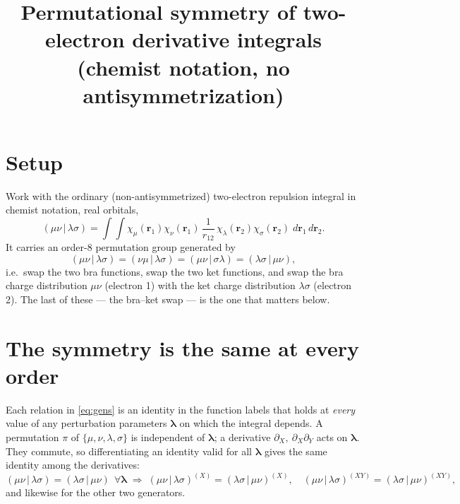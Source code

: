 \documentclass[11pt]{article}
\title{Permutational symmetry of two-electron derivative integrals\\
       \large (chemist notation, no antisymmetrization)}
\author{}
\date{}
\newcommand{\ci}[4]{(#1#2\,|\,#3#4)}          %
\newcommand{\pd}[1]{\partial_{#1}}
\begin{document}
\maketitle
\vspace{-3em}

\section{Setup}

Work with the ordinary (non-antisymmetrized) two-electron repulsion integral in
chemist notation, real orbitals,
%
\begin{equation}
\ci{\mu}{\nu}{\lambda}{\sigma}
= \int\!\!\int
   \chi_\mu(\mathbf r_1)\chi_\nu(\mathbf r_1)\,\frac{1}{r_{12}}\,
   \chi_\lambda(\mathbf r_2)\chi_\sigma(\mathbf r_2)\;
   d\mathbf r_1\,d\mathbf r_2 .
\end{equation}
%
It carries an order-8 permutation group generated by
%
\begin{equation}
\ci{\mu}{\nu}{\lambda}{\sigma} = \ci{\nu}{\mu}{\lambda}{\sigma}
= \ci{\mu}{\nu}{\sigma}{\lambda}
= \ci{\lambda}{\sigma}{\mu}{\nu} ,
\label{eq:gens}
\end{equation}
%
i.e.\ swap the two bra functions, swap the two ket functions, and swap the bra
charge distribution $\mu\nu$ (electron 1) with the ket charge distribution
$\lambda\sigma$ (electron 2). The last of these --- the bra--ket swap --- is the
one that matters below.

\section{The symmetry is the same at every order}

Each relation in \eqref{eq:gens} is an identity in the function labels that holds
at \emph{every} value of any perturbation parameters $\boldsymbol\lambda$ on which
the integral depends. A permutation $\pi$ of $\{\mu,\nu,\lambda,\sigma\}$ is
independent of $\boldsymbol\lambda$; a derivative $\pd{X},\ \pd{X}\pd{Y}$ acts on
$\boldsymbol\lambda$. They commute, so differentiating an identity valid for all
$\boldsymbol\lambda$ gives the same identity among the derivatives:
%
\begin{equation}
\ci{\mu}{\nu}{\lambda}{\sigma}=\ci{\lambda}{\sigma}{\mu}{\nu}
\ \ \forall\boldsymbol\lambda
\;\Longrightarrow\;
\ci{\mu}{\nu}{\lambda}{\sigma}^{(X)}=\ci{\lambda}{\sigma}{\mu}{\nu}^{(X)},\quad
\ci{\mu}{\nu}{\lambda}{\sigma}^{(XY)}=\ci{\lambda}{\sigma}{\mu}{\nu}^{(XY)},
\end{equation}
%
and likewise for the other two generators.
\end{document}
